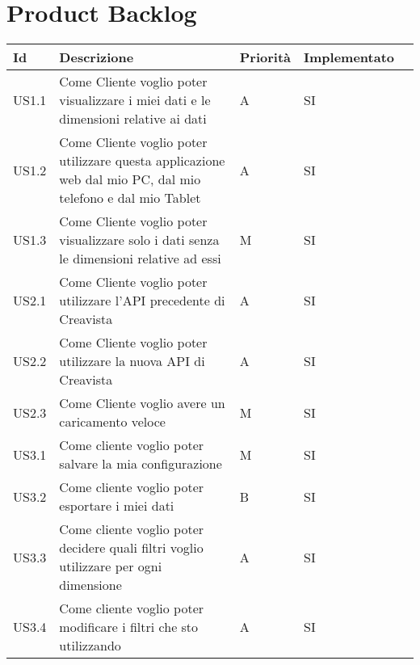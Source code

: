\section{Product Backlog}
\begin{longtable} {
		|>{}p{10mm}| 
		|>{}p{70mm}|
		|>{}p{15mm}|
		|>{}p{25mm}|
		>{}p{0mm}}
	\hline
	\textbf{Id} & \textbf{Descrizione} & \textbf{Priorità} & \textbf{Implementato} \\ \hline
	US1.1 & Come Cliente voglio poter visualizzare i miei dati e le dimensioni relative ai dati & A & SI \\ \hline
	US1.2 & Come Cliente voglio poter utilizzare questa applicazione web dal mio PC, dal mio telefono e dal mio Tablet & A & SI \\ \hline
	US1.3 & Come Cliente voglio poter visualizzare solo i dati senza le dimensioni relative ad essi & M & SI \\ \hline
	US2.1 & Come Cliente voglio poter utilizzare l'API precedente di Creavista & A & SI \\ \hline
	US2.2 & Come Cliente voglio poter utilizzare la nuova API di Creavista & A & SI \\ \hline
	US2.3 & Come Cliente voglio avere un caricamento veloce & M & SI \\ \hline
	US3.1 & Come cliente voglio poter salvare la mia configurazione & M & SI \\ \hline
	US3.2 & Come cliente voglio poter esportare i miei dati & B & SI \\ \hline
	US3.3 & Come cliente voglio poter decidere quali filtri voglio utilizzare per ogni dimensione & A & SI \\ \hline
	US3.4 & Come cliente voglio poter modificare i filtri che sto utilizzando & A & SI \\ \hline
	\hline
\end{longtable}
\newpage
